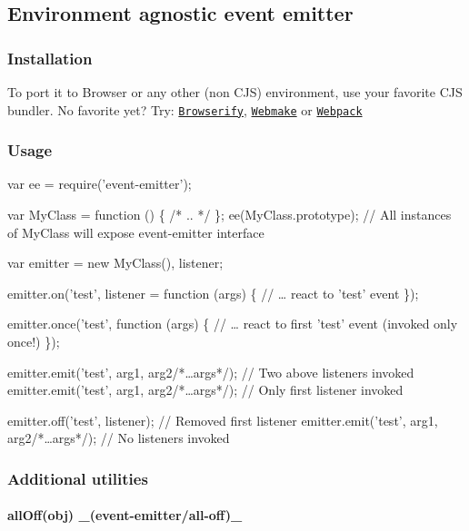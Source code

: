 \subsection*{Environment agnostic event emitter}

\subsubsection*{Installation}



To port it to Browser or any other (non C\+JS) environment, use your favorite C\+JS bundler. No favorite yet? Try\+: \href{http://browserify.org/}{\tt Browserify}, \href{https://github.com/medikoo/modules-webmake}{\tt Webmake} or \href{http://webpack.github.io/}{\tt Webpack}

\subsubsection*{Usage}


\begin{DoxyCode}
var ee = require('event-emitter');

var MyClass = function () \{ /* .. */ \};
ee(MyClass.prototype); // All instances of MyClass will expose event-emitter interface

var emitter = new MyClass(), listener;

emitter.on('test', listener = function (args) \{
  // … react to 'test' event
\});

emitter.once('test', function (args) \{
  // … react to first 'test' event (invoked only once!)
\});

emitter.emit('test', arg1, arg2/*…args*/); // Two above listeners invoked
emitter.emit('test', arg1, arg2/*…args*/); // Only first listener invoked

emitter.off('test', listener);              // Removed first listener
emitter.emit('test', arg1, arg2/*…args*/); // No listeners invoked
\end{DoxyCode}
 \subsubsection*{Additional utilities}

\paragraph*{all\+Off(obj) \+\_\+(event-\/emitter/all-\/off)\+\_\+}

